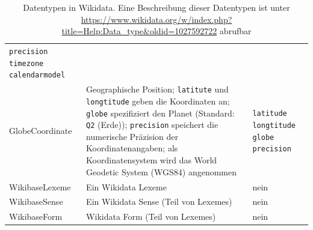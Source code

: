 \begin{table}
\begin{adjustwidth}{-1cm}{-1cm}
\begin{minipage}{\textwidth}
\begin{tabular}{l p{} p{}}
                                                                                                                                                                                         \verb|precision|\newline{}
                                                                                                                                                                                         \verb|timezone|\newline{}
                                                                                                                                                                                         \verb|calendarmodel| \\
      GlobeCoordinate  & Geographische Position; \verb|latitute| und \verb|longtitude| geben die Koordinaten an; \verb|globe| spezifiziert den Planet (Standard: \verb|Q2| (Erde));
                         \verb|precision| speichert die numerische Präzision der Koordinatenangaben; als Koordinatensystem wird das World Geodetic System (WGS84) angenommen           & \verb|latitude|\newline{}
                                                                                                                                                                                         \verb|longtitude|\newline{}
                                                                                                                                                                                         \verb|globe|\newline{}
                                                                                                                                                                                         \verb|precision| \\
      WikibaseLexeme   & Ein Wikidata Lexeme                                                                                                                                           & nein \\
      WikibaseSense    & Ein Wikidata Sense (Teil von Lexemes)                                                                                                                         & nein \\
      WikibaseForm     & Wikidata Form (Teil von Lexemes)                                                                                                                              & nein
    \end{tabular}
    \end{minipage}
  \end{adjustwidth}
  \caption{Datentypen in Wikidata. Eine Beschreibung dieser Datentypen ist unter \url{https://www.wikidata.org/w/index.php?title=Help:Data_type&oldid=1027592722} abrufbar}
  \label{tab:wd-datatypes}
\end{table}

